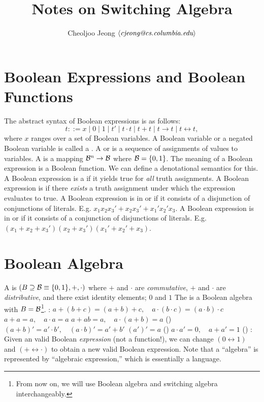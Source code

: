 \documentclass{myproc}
\def\sbf{\sf\bfseries}
\begin{document}
\title{\large\bf Notes on Switching Algebra \vspace*{-0.5cm}}
\author{\small{}Cheoljoo Jeong $\mbox{$\langle{\textit{\mbox{cjeong@cs.columbia.edu}}}\rangle$}$}
\maketitle
\small

\section{Boolean Expressions and Boolean Functions}
\bit
\w The abstract syntax of Boolean expressions is as follows:
  \[ t ::= x \mid 0 \mid 1 \mid  t' \mid  t\cdot{t} \mid t + t \mid t
  \rightarrow t \mid t \leftrightarrow t,\]
  where $x$ ranges over a set of Boolean variables.
  A Boolean variable or a negated Boolean variable is called a .
\w A  or  
  is a sequence of assignments of values to variables.
\w A  is a mapping ${\cal B}^n \rightarrow {\cal B}$
   where ${\cal B} = \{0, 1\}$.
\w The meaning of a Boolean expression is a Boolean function. We can define a
  denotational semantics for this.
\w A Boolean expression is a  if it yields true for {\em all\/}
   truth
  assignments. 
\w A Boolean expression is  if there {\em exists\/} a truth
  assignment under which the expression evaluates to true.
\w A Boolean expression is in  or  if
   it consists of a disjunction of conjunctions of literals. E.g.
   $x_1x_2x_3' + x_2x_3' + x_1'x_2'x_3$.
\w A Boolean expression is in  or  if
   it consists of a conjunction of disjunctions of literals. E.g.
   $(x_1 + x_2 + x_3')(x_2 + x_3')(x_1' + x_2' + x_3)$.
\eit

\section{Boolean Algebra}
\bit
\w A  is $(B \supseteq {\cal B} \equiv \{0, 1\}, +,
\cdot)$ where
  \ben
  \w [(a)] $+$ and $\cdot$ are {\em commutative\/},
  \w [(b)] $+$ and $\cdot$ are {\em distributive\/}, and
  \w [(c)] there exist identity elements; $0$ and $1$
  \een
\w The  is a 
   Boolean algebra with $B = {\cal B}$\footnote{
   From now on, we will use Boolean algebra and switching algebra
   interchangeably.}.
\w {\sbf Properties}:
  \ben
  \w [(a)] $a + (b + c) = (a + b) + c, \quad a\cdot(b\cdot{}c) = (a\cdot{}b)\cdot{}c$
  \w [(b)] $a + a = a, \quad a\cdot{}a = a$
  \w [(c)] $a + ab = a, \quad a\cdot(a + b) = a$ ()
  \w [(d)] $(a + b)' = a'\cdot{}b', \quad (a\cdot{}b)' = a' + b'$
  \w [(e)] $(a')' = a$ ()
  \w [(f)] $a\cdot{}a' = 0, \quad a + a' = 1$ ()
  \een
\w {}: Given an valid Boolean {\em expression\/} 
   (not a function!), we can change $(0 \leftrightarrow 1)$ and
   $(+ \leftrightarrow \cdot)$ to obtain a new valid Boolean expression.
   \bit
   \w Note that a ``algebra'' is represented by ``algebraic expression,''
   which is essentially a language.
   \eit
\eit
\end{document}
